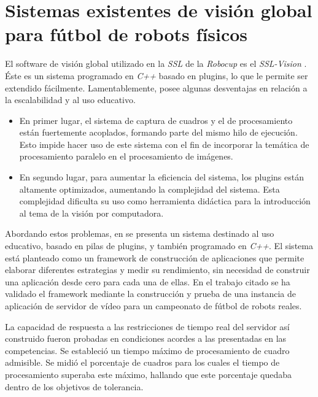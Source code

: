 
\section{Sistemas existentes de visión global para fútbol de robots físicos}


El software de visión global utilizado en la \emph{SSL} de la \emph{Robocup} es
el \emph{SSL-Vision} \cite{sslvision}. Éste es un sistema programado en
\emph{C++} basado en plugins, lo que le permite ser extendido fácilmente.
Lamentablemente, posee algunas desventajas en relación a la escalabilidad y al
uso educativo.

\begin{itemize}

	\item 	En primer lugar, el sistema de captura de cuadros y el de
		procesamiento están fuertemente acoplados, formando parte del
		mismo hilo de ejecución. Esto impide hacer uso de este sistema
		con el fin de incorporar la temática de procesamiento paralelo
		en el procesamiento de imágenes.

	\item 	En segundo lugar, para aumentar la eficiencia del sistema, los
		plugins están altamente optimizados, aumentando la complejidad
		del sistema. Esta complejidad dificulta su uso como herramienta
		didáctica para la introducción al tema de la visión por
		computadora.

\end{itemize}

Abordando estos problemas, en \cite{torres2014} se presenta un sistema destinado
al uso educativo, basado en pilas de plugins, y también programado en
\emph{C++}. El sistema está planteado como un framework de construcción de
aplicaciones que permite elaborar diferentes estrategias y medir su rendimiento,
sin necesidad de construir una aplicación desde cero para cada una de ellas. En
el trabajo citado se ha validado el framework mediante la construcción y prueba
de una instancia de aplicación de servidor de vídeo para un campeonato de fútbol
de robots reales.

La capacidad de respuesta a las restricciones de tiempo real del servidor así
construido fueron probadas en condiciones acordes a las presentadas en las
competencias. Se estableció un tiempo máximo de procesamiento de cuadro
admisible. Se midió el porcentaje de cuadros para los cuales el tiempo de
procesamiento superaba este máximo, hallando que este porcentaje quedaba dentro
de los objetivos de tolerancia.

